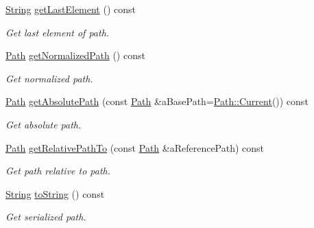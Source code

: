 \begin{DoxyCompactItemize}
\hyperlink{classlibrary_1_1core_1_1types_1_1_string}{String} \hyperlink{classlibrary_1_1core_1_1fs_1_1_path_a1beabf215fcc96dde591838556e00370}{get\+Last\+Element} () const
\begin{DoxyCompactList}\small\item\em Get last element of path. \end{DoxyCompactList}\item 
\hyperlink{classlibrary_1_1core_1_1fs_1_1_path}{Path} \hyperlink{classlibrary_1_1core_1_1fs_1_1_path_a920b1d062cb1274da811150afafba124}{get\+Normalized\+Path} () const
\begin{DoxyCompactList}\small\item\em Get normalized path. \end{DoxyCompactList}\item 
\hyperlink{classlibrary_1_1core_1_1fs_1_1_path}{Path} \hyperlink{classlibrary_1_1core_1_1fs_1_1_path_a3a4c995e4b1ca0f26abbf65d3a244446}{get\+Absolute\+Path} (const \hyperlink{classlibrary_1_1core_1_1fs_1_1_path}{Path} \&a\+Base\+Path=\hyperlink{classlibrary_1_1core_1_1fs_1_1_path_adbdaa4e7ab2a1b399746782668863e53}{Path\+::\+Current}()) const
\begin{DoxyCompactList}\small\item\em Get absolute path. \end{DoxyCompactList}\item 
\hyperlink{classlibrary_1_1core_1_1fs_1_1_path}{Path} \hyperlink{classlibrary_1_1core_1_1fs_1_1_path_a8f24340e887cfbfe675e96c0ba92321f}{get\+Relative\+Path\+To} (const \hyperlink{classlibrary_1_1core_1_1fs_1_1_path}{Path} \&a\+Reference\+Path) const
\begin{DoxyCompactList}\small\item\em Get path relative to path. \end{DoxyCompactList}\item 
\hyperlink{classlibrary_1_1core_1_1types_1_1_string}{String} \hyperlink{classlibrary_1_1core_1_1fs_1_1_path_a6f78df53d8e604dd9e1b43e23311724a}{to\+String} () const
\begin{DoxyCompactList}\small\item\em Get serialized path. \end{DoxyCompactList}\end{DoxyCompactItemize}
